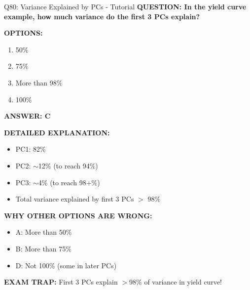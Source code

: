 \documentclass[8pt]{beamer}
\begin{document}
	\begin{frame}{Q80: Variance Explained by PCs - Tutorial}
		\fontsize{6.5}{7.5}\selectfont
		\textbf{QUESTION: In the yield curve example, how much variance do the first 3 PCs explain?}
		
		\vspace{0.1cm}
		\textbf{OPTIONS:}
		\begin{enumerate}
			\item 50\%
			\item 75\%
			\item More than 98\%
			\item 100\%
		\end{enumerate}
		
		\vspace{0.1cm}
		\textcolor{myblue}{\textbf{ANSWER: C}}
		
		\vspace{0.1cm}
		\textbf{DETAILED EXPLANATION:}
		\begin{itemize}
			\item PC1: 82\%
			\item PC2: $\sim$12\% (to reach 94\%)
			\item PC3: $\sim$4\% (to reach 98+\%)
			\item Total variance explained by first 3 PCs $>$ 98\%
		\end{itemize}
		
		\vspace{0.1cm}
		\textcolor{myred}{\textbf{WHY OTHER OPTIONS ARE WRONG:}}
		\begin{itemize}
			\item \textcolor{myred}{A:} More than 50\%
			\item \textcolor{myred}{B:} More than 75\%
			\item \textcolor{myred}{D:} Not 100\% (some in later PCs)
		\end{itemize}
		
		\textcolor{myred}{\textbf{EXAM TRAP:}} First 3 PCs explain \textcolor{myblue}{$>$98\% of variance} in yield curve!
	\end{frame}
	
\end{document}
